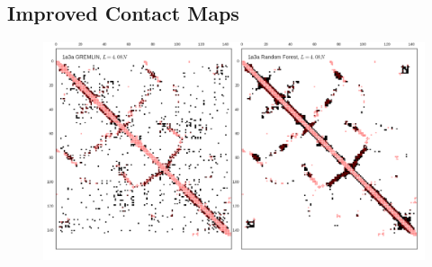 \documentclass[landscape]{sciposter}
\newlength{\customfigheight}
\begin{document}
\begin{multicols}{3}
\section*{Improved Contact Maps}

\begin{figure}
    \center 
    \includegraphics[height=1.25\customfigheight]{figures/1a3a_cmp.png}%
\end{figure}


\columnbreak
\end{multicols}
\end{document}
